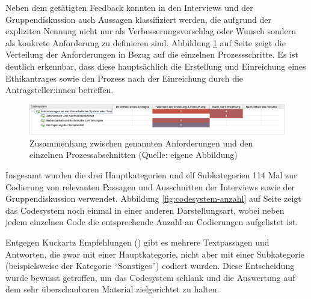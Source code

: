 \documentclass[a4paper,12pt,twoside]{scrreprt}
\begin{document}
Neben dem getätigten Feedback konnten in den Interviews und der Gruppendiskussion auch Aussagen klassifiziert werden, die aufgrund der expliziten Nennung nicht nur als Verbesserungsvorschlag oder Wunsch sondern als konkrete Anforderung zu definieren sind. Abbildung \ref{fig:anforderungen-x-prozess} auf Seite \pageref{fig:anforderungen-x-prozess} zeigt die Verteilung der Anforderungen in Bezug auf die einzelnen Prozessschritte. Es ist deutlich erkennbar, dass diese hauptsächlich die Erstellung und Einreichung eines Ethikantrages sowie den Prozess nach der Einreichung durch die Antragsteller:innen betreffen.

\begin{figure}[ht]
    \centering
    \includegraphics[width=\linewidth]{thesis/images/Luidold_Anforderungen-Prozess.png}
    \caption[Zusammenhang zwischen genannten Anforderungen und den einzelnen Prozessabschnitten]{Zusammenhang zwischen genannten Anforderungen und den einzelnen Prozessabschnitten (Quelle: eigene Abbildung)}
    \label{fig:anforderungen-x-prozess}
\end{figure}

Insgesamt wurden die drei Hauptkategorien und elf Subkategorien 114 Mal zur Codierung von relevanten Passagen und Ausschnitten der Interviews sowie der Gruppendiskussion verwendet. Abbildung \ref{fig:codesystem-anzahl} auf Seite \pageref{fig:codesystem-anzahl} zeigt das Codesystem noch einmal in einer anderen Darstellungsart, wobei neben jedem einzelnen Code die entsprechende Anzahl an Codierungen aufgelistet ist.

Entgegen Kuckartz Empfehlungen (\cite[108]{kuckartz_qualitative_2018}) gibt es mehrere Textpassagen und Antworten, die zwar mit einer Hauptkategorie, nicht aber mit einer Subkategorie (beispielsweise der Kategorie \enquote{Sonstiges}) codiert wurden. Diese Entscheidung wurde bewusst getroffen, um das Codesystem schlank und die Auswertung auf dem sehr überschaubaren Material zielgerichtet zu halten.
\end{document}
